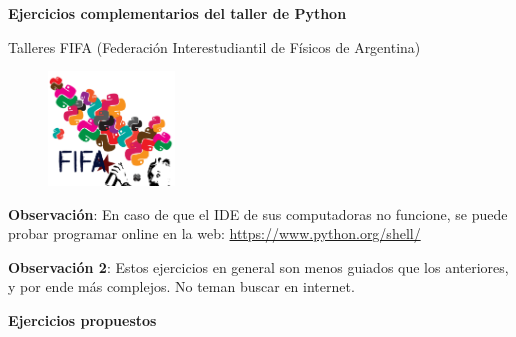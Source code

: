 \documentclass[a4paper]{article}
\begin{document}
\thispagestyle{empty}

\centerline{{\bf\Large{Ejercicios complementarios del taller de Python}}}

\centerline{{\ttfamily Talleres FIFA (Federación Interestudiantil de Físicos de Argentina)}}

\begin{figure}[H]
 \centering
   \includegraphics[width=0.3\textwidth]{logos_python_fifa.png}
 \label{FIFA}
 \end{figure}

\bigskip


\textbf{Observación}:
En caso de que el IDE de sus computadoras no funcione, se puede probar programar online en la web: \url{https://www.python.org/shell/}

\textbf{Observación 2}:
Estos ejercicios en general son menos guiados que los anteriores, y por ende más complejos. No teman buscar en internet.

\bigskip
\centerline{\bf Ejercicios propuestos}
\bigskip
\end{document}
